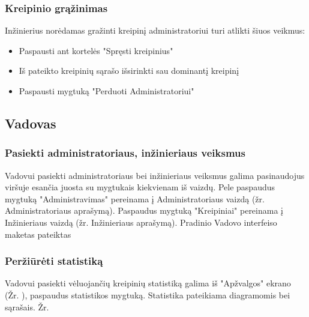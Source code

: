 	\subsubsection{Kreipinio grąžinimas}
	
	Inžinierius norėdamas gražinti kreipinį administratoriui turi atlikti šiuos veikmus:
	
	\begin{itemize}
		\item Paspausti ant kortelės "Spręsti kreipinius" 
		\item Iš pateikto kreipinių sąrašo išsirinkti sau dominantį kreipinį 
		\item Paspausti mygtuką "Perduoti Administratoriui" 
	\end{itemize}

\subsection{Vadovas}

	\subsubsection{Pasiekti administratoriaus, inžinieriaus veiksmus}
		
	
	Vadovui pasiekti administratoriaus bei inžinieriaus veiksmus galima pasinaudojus viršuje esančia juosta su mygtukais kiekvienam iš vaizdų.
	Pele paspaudus mygtuką "Administravimas" pereinama į Administratoriaus vaizdą (žr. Administratoriaus aprašymą).
	Paspaudus mygtuką "Kreipiniai" pereinama į Inžinieriaus vaizdą (žr. Inžinieriaus aprašymą).
	Pradinio Vadovo interfeiso maketas pateiktas 
	
	\subsubsection{Peržiūrėti statistiką}	
	
	
	
	Vadovui pasiekti vėluojančių kreipinių statistiką galima iš "Apžvalgos" ekrano (Žr. ), paspaudus statistikos mygtuką.
	Statistika pateikiama diagramomis bei sąrašais. Žr. 
	
